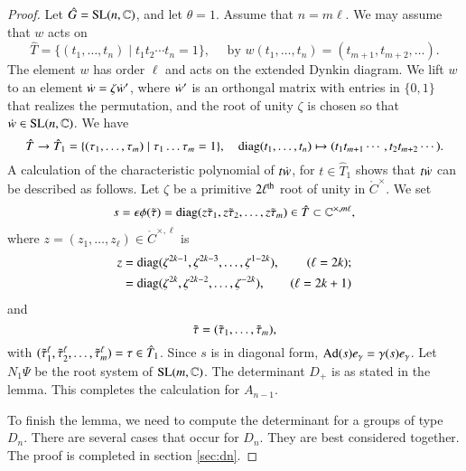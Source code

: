 \begin{proof}
Let $\hat G = {\operatorname{SL}}(n,\mathbb{C})$, and let $\theta=1$.
Assume that $n=m \ell$. 
We may assume that $w$ acts on 
\[
\hat T = \{(t_1,\ldots,t_{n})\mid t_1t_2\cdots t_{n}=1\},\quad \text{ by } w(t_1,\ldots,t_{n}) = (t_{m+1},t_{m+2},\ldots).
\]
The element $w$ has order $\ell$ and acts on the extended Dynkin diagram.
We lift $w$ to an element $\dot w = \zeta \dot w'$, where $\dot w'$ is an orthongal matrix  with entries in $\{0,1\}$ that realizes the
permutation, and the root of unity $\zeta$ is chosen so that $\dot w \in {\operatorname{SL}}(n,\mathbb{C})$.
We have
\[
\hat T \to \hat T_1 = \{(\tau_1,\ldots,\tau_m)\mid \tau_1\ldots\tau_m=1\},\quad {\operatorname{diag}}(t_1,\ldots,t_n)\mapsto (t_1t_{m+1}\cdots,t_2 t_{m+2}\cdots).
\]
A  calculation of the characteristic polynomial of $t\dot w$, for $t\in \hat T_1$ shows that $t\dot w$ can be described as follows.
Let $\zeta$ be a primitive $2\ell^{\operatorname{th}}$ root of unity in $\ring{C}^\times$.
We set 
\begin{equation}
s=\epsilon\phi(\tilde\tau)={\operatorname{diag}}(z\tilde\tau_1,z\tilde\tau_2,\ldots,z\tilde\tau_m)\in \hat T\subset \mathbb{C}^{\times,m\ell},
\end{equation}
where $z=(z_1,\ldots,z_\ell)\in \ring{C}^{\times,\ell}$ is
\begin{align*}
z &= {\operatorname{diag}}(\zeta^{2k-1},\zeta^{2k-3},\ldots,\zeta^{1-2k}), &(\ell=2k);\\
      &= {\operatorname{diag}}(\zeta^{2k},\zeta^{2k-2},\ldots,\zeta^{-2k}), &(\ell=2k+1)
\end{align*}
and
\[
\tilde\tau=(\tilde\tau_1,\ldots,\tilde\tau_m),
\]
with $(\tilde\tau_1^\ell,\tilde\tau_2^\ell,\ldots,\tilde\tau_m^\ell) = \tau\in \hat T_1$.
Since $s$ is in diagonal form, ${\operatorname{Ad}}(s) e_\gamma = \gamma(s) e_\gamma$.
Let $N_1\Psi$ be the root system of ${\operatorname{SL}}(m,\mathbb{C})$. 
The determinant $D_+$ is as stated in the lemma.
This completes the calculation for $A_{n-1}$.

To finish the lemma, we need to compute the determinant for a groups of type $D_n$.   There are several cases that
occur for $D_n$.  They are best considered together.  The proof is completed in section \ref{sec:dn}.
\end{proof}

